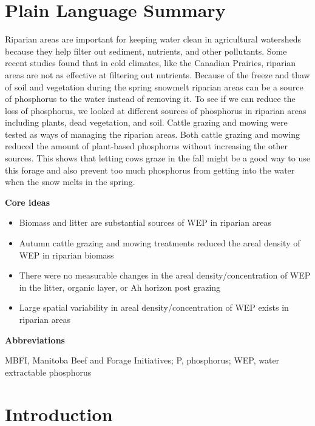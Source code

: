 \documentclass[
]{agujournal2019}
\providecommand{\tightlist}{%
  \setlength{\itemsep}{0pt}\setlength{\parskip}{0pt}}\usepackage{longtable,booktabs,array}
\begin{document}
\section*{Plain Language Summary}
Riparian areas are important for keeping water clean in agricultural
watersheds because they help filter out sediment, nutrients, and other
pollutants. Some recent studies found that in cold climates, like the
Canadian Prairies, riparian areas are not as effective at filtering out
nutrients. Because of the freeze and thaw of soil and vegetation during
the spring snowmelt riparian areas can be a source of phosphorus to the
water instead of removing it. To see if we can reduce the loss of
phosphorus, we looked at different sources of phosphorus in riparian
areas including plants, dead vegetation, and soil. Cattle grazing and
mowing were tested as ways of managing the riparian areas. Both cattle
grazing and mowing reduced the amount of plant-based phosphorus without
increasing the other sources. This shows that letting cows graze in the
fall might be a good way to use this forage and also prevent too much
phosphorus from getting into the water when the snow melts in the
spring.




\textbf{Core ideas}

\begin{itemize}
\tightlist
\item
  Biomass and litter are substantial sources of WEP in riparian areas
\item
  Autumn cattle grazing and mowing treatments reduced the areal density
  of WEP in riparian biomass
\item
  There were no measurable changes in the areal density/concentration of
  WEP in the litter, organic layer, or Ah horizon post grazing
\item
  Large spatial variability in areal density/concentration of WEP exists
  in riparian areas
\end{itemize}

\textbf{Abbreviations}

MBFI, Manitoba Beef and Forage Initiatives; P, phosphorus; WEP, water
extractable phosphorus

\section{Introduction}\label{introduction}
\end{document}
